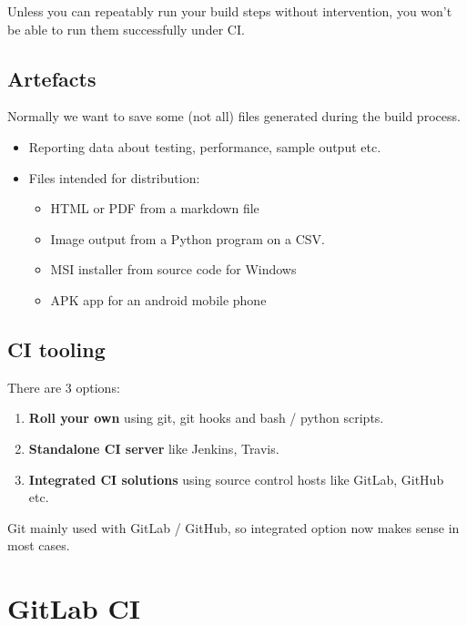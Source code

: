 \documentclass[slides]{pgnotes}
\begin{document}
Unless you can repeatably run your build steps without intervention, you won't be able to run them successfully under CI.


\subsection{Artefacts}

Normally we want to save some (not all) files generated during the build process.

\begin{itemize}
\item Reporting data about testing, performance, sample output etc.
\item Files intended for distribution:
  \begin{itemize}
  \item HTML or PDF from a markdown file
  \item Image output from a Python program on a CSV.
  \item MSI installer from source code for Windows
  \item APK app for an android mobile phone
  \end{itemize}
\end{itemize}

\subsection{CI tooling}

There are 3 options:

\begin{enumerate}

\item \textbf{Roll your own} using git, git hooks and bash / python scripts.

\item \textbf{Standalone CI server} like Jenkins, Travis.

\item \textbf{Integrated CI solutions} using source control hosts like GitLab, GitHub etc. 

\end{enumerate}

Git mainly used with GitLab / GitHub, so integrated option now makes sense in most cases. 


\section{GitLab CI}
\end{document}

